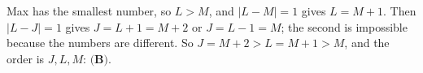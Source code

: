 Max has the smallest number, so $L>M$, and $|L-M|=1$ gives $L=M+1$. Then $|L-J|=1$ gives $J=L+1=M+2$ or $J=L-1=M$; the second is impossible because the numbers are different. So $J=M+2>L=M+1>M$, and the order is $J,L,M$: $\boxed{\textbf{(B)}}$.
